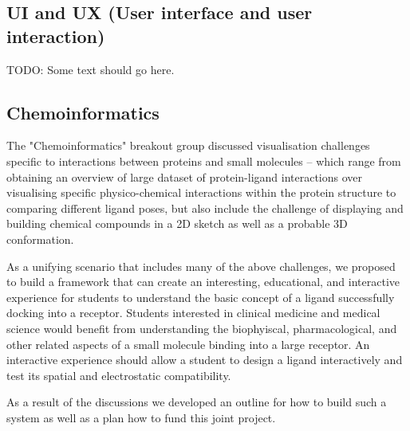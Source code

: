 \documentclass[a4paper]{article}
\begin{document}
\subsection{UI and UX (User interface and user interaction)}

TODO: Some text should go here.


\subsection{Chemoinformatics}

The "Chemoinformatics" breakout group discussed visualisation challenges specific to interactions between proteins and small molecules -- which range from obtaining an overview of large dataset of protein-ligand interactions over visualising specific physico-chemical interactions within the protein structure to comparing different ligand poses, but also include the challenge of displaying and building chemical compounds in a 2D sketch as well as a probable 3D conformation. 

As a unifying scenario that includes many of the above challenges, we proposed to build a framework that can create an interesting, educational, and interactive experience for students to understand the basic concept of a ligand successfully docking into a receptor.  Students interested in clinical medicine and medical science would benefit from understanding the biophyiscal, pharmacological, and other related aspects of a small molecule binding into a large receptor. An interactive experience should allow a student to design a ligand interactively and test its spatial and electrostatic compatibility.

As a result of the discussions we developed an outline for how to build such a system as well as a plan how to fund this joint project. 
\end{document}
